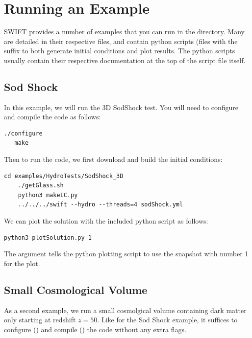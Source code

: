 \section{Running an Example}

SWIFT provides a number of examples that you can run in the 
directory. Many are detailed in their respective  files, and contain
python scripts (files with the suffix  to both generate initial
conditions and plot results. The python scripts usually contain their
respective documentation at the top of the script file itself.


\subsection{Sod Shock}

In this example, we will run the 3D SodShock test. You will need to configure and
compile the code as follows:

\begin{lstlisting}[style=codeblock]
   ./configure
   make
\end{lstlisting}

\columnbreak

Then to run the code, we first download and build the
initial conditions:

\begin{lstlisting}[style=codeblock]
    cd examples/HydroTests/SodShock_3D
    ./getGlass.sh
    python3 makeIC.py
    ../../../swift --hydro --threads=4 sodShock.yml
\end{lstlisting}

We can plot the solution with the included python script
as follows:

\begin{lstlisting}[style=codeblock]
    python3 plotSolution.py 1
\end{lstlisting}

The argument  tells the python plotting script to use the snapshot with number
1 for the plot.



\subsection{Small Cosmological Volume}

As a second example, we run a small cosmolgical volume containing dark matter
only starting at redshift $z = 50$. Like for the Sod Shock example, it suffices
to configure () and compile () the code
without any extra flags.

